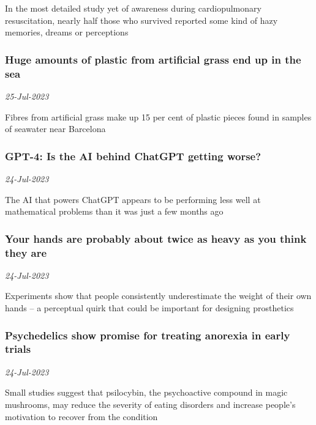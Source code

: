 In the most detailed study yet of awareness during cardiopulmonary resuscitation, nearly half those who survived reported some kind of hazy memories, dreams or perceptions
\subsubsection{Huge amounts of plastic from artificial grass end up in the sea \href{https://www.newscientist.com/article/2383869-huge-amounts-of-plastic-from-artificial-grass-end-up-in-the-sea/?utm_campaign=RSS%7CNSNS&utm_source=NSNS&utm_medium=RSS&utm_content=home}{\ding{225}}}
\textit{25-Jul-2023}

Fibres from artificial grass make up 15 per cent of plastic pieces found in samples of seawater near Barcelona
\subsubsection{GPT-4: Is the AI behind ChatGPT getting worse? \href{https://www.newscientist.com/article/2383850-gpt-4-is-the-ai-behind-chatgpt-getting-worse/?utm_campaign=RSS%7CNSNS&utm_source=NSNS&utm_medium=RSS&utm_content=home}{}}
\textit{24-Jul-2023}

The AI that powers ChatGPT appears to be performing less well at mathematical problems than it was just a few months ago
\subsubsection{Your hands are probably about twice as heavy as you think they are \href{https://www.newscientist.com/article/2383998-your-hands-are-probably-about-twice-as-heavy-as-you-think-they-are/?utm_campaign=RSS%7CNSNS&utm_source=NSNS&utm_medium=RSS&utm_content=home}{\ding{225}}}
\textit{24-Jul-2023}

Experiments show that people consistently underestimate the weight of their own hands – a perceptual quirk that could be important for designing prosthetics
\subsubsection{Psychedelics show promise for treating anorexia in early trials \href{https://www.newscientist.com/article/2381646-psychedelics-show-promise-for-treating-anorexia-in-early-trials/?utm_campaign=RSS%7CNSNS&utm_source=NSNS&utm_medium=RSS&utm_content=home}{}}
\textit{24-Jul-2023}

Small studies suggest that psilocybin, the psychoactive compound in magic mushrooms, may reduce the severity of eating disorders and increase people’s motivation to recover from the condition
